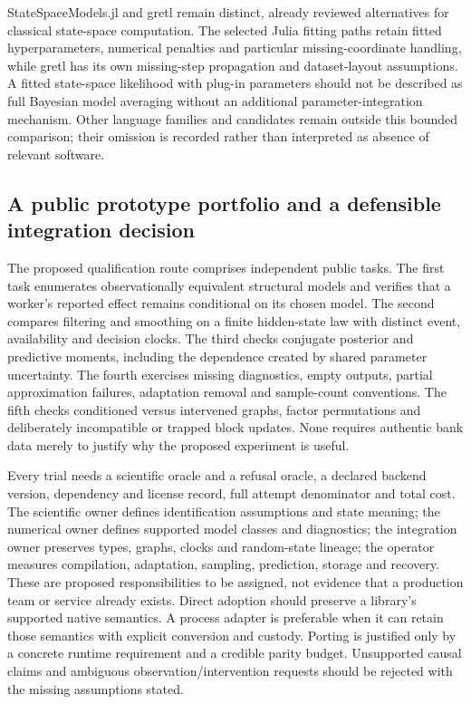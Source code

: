 StateSpaceModels.jl and gretl remain distinct, already reviewed alternatives for classical state-space computation. The selected Julia fitting paths retain fitted hyperparameters, numerical penalties and particular missing-coordinate handling, while gretl has its own missing-step propagation and dataset-layout assumptions. A fitted state-space likelihood with plug-in parameters should not be described as full Bayesian model averaging without an additional parameter-integration mechanism. Other language families and candidates remain outside this bounded comparison; their omission is recorded rather than interpreted as absence of relevant software.~\citep{exec25_odyn_ssm,exec25_odyn_gretl,exec25_odyn_choice,exec25_bsw_choice}

\subsection{A public prototype portfolio and a defensible integration decision}

The proposed qualification route comprises independent public tasks. The first task enumerates observationally equivalent structural models and verifies that a worker's reported effect remains conditional on its chosen model. The second compares filtering and smoothing on a finite hidden-state law with distinct event, availability and decision clocks. The third checks conjugate posterior and predictive moments, including the dependence created by shared parameter uncertainty. The fourth exercises missing diagnostics, empty outputs, partial approximation failures, adaptation removal and sample-count conventions. The fifth checks conditioned versus intervened graphs, factor permutations and deliberately incompatible or trapped block updates. None requires authentic bank data merely to justify why the proposed experiment is useful.~\citep{exec25_bsw_choice}

Every trial needs a scientific oracle and a refusal oracle, a declared backend version, dependency and license record, full attempt denominator and total cost. The scientific owner defines identification assumptions and state meaning; the numerical owner defines supported model classes and diagnostics; the integration owner preserves types, graphs, clocks and random-state lineage; the operator measures compilation, adaptation, sampling, prediction, storage and recovery. These are proposed responsibilities to be assigned, not evidence that a production team or service already exists. Direct adoption should preserve a library's supported native semantics. A process adapter is preferable when it can retain those semantics with explicit conversion and custody. Porting is justified only by a concrete runtime requirement and a credible parity budget. Unsupported causal claims and ambiguous observation/intervention requests should be rejected with the missing assumptions stated.~\citep{exec25_bsw_choice}

